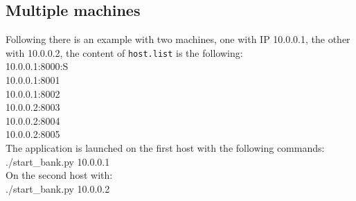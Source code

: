 \documentclass{article}
\begin{document}
        \subsection{Multiple machines}
        Following there is an example with two machines, one with IP 10.0.0.1, the other with 10.0.0.2, the content of \texttt{host.list} is the following:\\
        10.0.0.1:8000:S\\
        10.0.0.1:8001\\
        10.0.0.1:8002\\
        10.0.0.2:8003\\
        10.0.0.2:8004\\
        10.0.0.2:8005\\
        The application is launched on the first host with the following commands:\\
        ./start\_bank.py 10.0.0.1\\
        On the second host with:\\
        ./start\_bank.py 10.0.0.2
\end{document}
